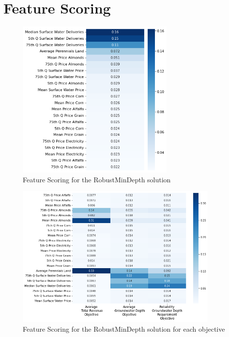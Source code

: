 \documentclass[11pt,a4paper]{article}
\begin{document}
\section{Feature Scoring}

\begin{figure}[H]
    \centering
    \includegraphics[width=0.7\textwidth]{./figs/prim_robust_mindepth_rank.png}
    \caption{Feature Scoring for the RobustMinDepth solution}
    \label{fig:m1esh1}
\end{figure}

\begin{figure}[H]
    \centering
    \includegraphics[width=0.9\textwidth]{./figs/prim_robust_mindepth_rank_objectives.png}
    \caption{Feature Scoring for the RobustMinDepth solution for each objective}
    \label{fig:m1esh1}
\end{figure}

\newpage
\printbibliography
\end{document}
